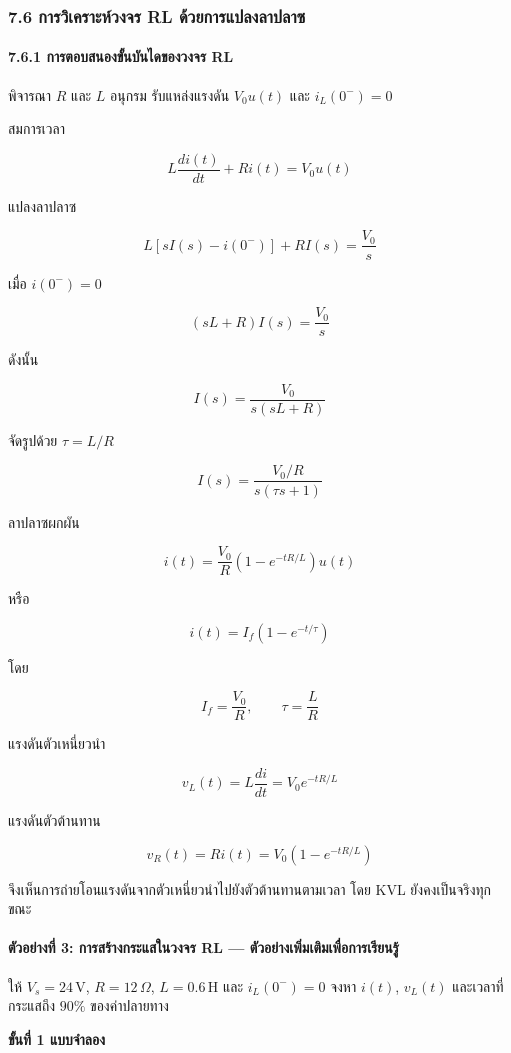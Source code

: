 \subsubsection{7.6 การวิเคราะห์วงจร RL ด้วยการแปลงลาปลาซ}

\paragraph{7.6.1 การตอบสนองขั้นบันไดของวงจร RL}

พิจารณา $R$ และ $L$ อนุกรม รับแหล่งแรงดัน $V_0u(t)$ และ $i_L(0^-)=0$

สมการเวลา

\[
L\frac{di(t)}{dt}+Ri(t)=V_0u(t)
\]

แปลงลาปลาซ

\[
L[sI(s)-i(0^-)]+RI(s)=\frac{V_0}{s}
\]

เมื่อ $i(0^-)=0$

\[
(sL+R)I(s)=\frac{V_0}{s}
\]

ดังนั้น

\[
I(s)=\frac{V_0}{s(sL+R)}
\]

จัดรูปด้วย $\tau=L/R$

\[
I(s)=\frac{V_0/R}{s(\tau s+1)}
\]

ลาปลาซผกผัน

\[
\boxed{i(t)=\frac{V_0}{R}\left(1-e^{-tR/L}\right)u(t)}
\]

หรือ

\[
\boxed{i(t)=I_f\left(1-e^{-t/\tau}\right)}
\]

โดย

\[
I_f=\frac{V_0}{R},\qquad \tau=\frac{L}{R}
\]

แรงดันตัวเหนี่ยวนำ

\[
v_L(t)=L\frac{di}{dt}=V_0e^{-tR/L}
\]

แรงดันตัวต้านทาน

\[
v_R(t)=Ri(t)=V_0\left(1-e^{-tR/L}\right)
\]

จึงเห็นการถ่ายโอนแรงดันจากตัวเหนี่ยวนำไปยังตัวต้านทานตามเวลา โดย KVL ยังคงเป็นจริงทุกขณะ

\paragraph{ตัวอย่างที่ 3: การสร้างกระแสในวงจร RL — ตัวอย่างเพิ่มเติมเพื่อการเรียนรู้}

ให้ $V_s=24\,\text{V}$, $R=12\,\Omega$, $L=0.6\,\text{H}$ และ $i_L(0^-)=0$ จงหา $i(t)$, $v_L(t)$ และเวลาที่กระแสถึง $90\%$ ของค่าปลายทาง

\textbf{ขั้นที่ 1 แบบจำลอง}

